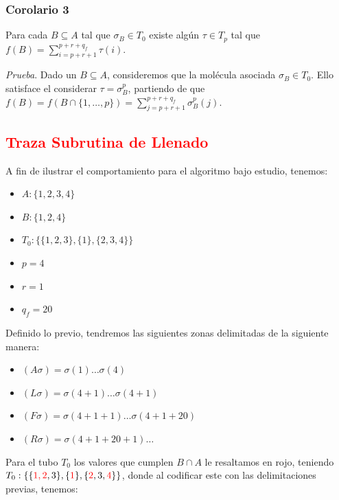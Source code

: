 \documentclass[12pt, letterpaper, twoside]{article}
\begin{document}
    \subsubsection{Corolario 3}
    Para cada $B\subseteq{A}$ tal que $\sigma_{B}\in{T_0}$ existe algún $\tau\in{T_{p}}$ tal que $f(B)=\sum^{p+r+q_f}_{i=p+r+1}\tau(i)$.

    \emph{Prueba}. Dado un $B\subseteq{A}$, consideremos que la molécula asociada $\sigma_{B}\in{T_0}$. Ello satisface el considerar $\tau=\sigma^{p}_{B}$, partiendo de que $f(B)=f(B\cap{\{1,\dots,p\}})=\sum^{p+r+q_f}_{j=p+r+1}\sigma^{p}_{B}(j)$. 

    \newpage
    \subsection{\textcolor{red}{Traza Subrutina de Llenado}}
    A fin de ilustrar el comportamiento para el algoritmo bajo estudio, tenemos:
    \begin{multicols}{2}
        \begin{itemize}
        \item $A: \{1, 2, 3, 4\}$
        \item $B: \{1, 2, 4\}$
        \item $T_0: \{\{1,2,3\}, \{1\}, \{2,3,4\}\}$
        \item $p = 4$
        \item $r = 1$
        \item $q_f= 20$
        \end{itemize}
    \end{multicols}

    Definido lo previo, tendremos las siguientes zonas delimitadas de la siguiente manera:
    \begin{multicols}{2}
        \begin{itemize}
            \item $(A\sigma )=\sigma (1)\dots\sigma (4)$
            \item $(L\sigma )=\sigma (4+1)\dots\sigma (4+1)$
            \item $(F\sigma)=\sigma(4+1+1)\dots\sigma(4+1+20)$
            \item $(R\sigma)=\sigma(4+1+20+1)\dots$
        \end{itemize} 
    \end{multicols}

    Para el tubo $T_0$ los valores que cumplen $B\cap{A}$ le resaltamos en rojo, teniendo $T_0: \{\{\textcolor{red}{1, 2}, 3\}, \{\textcolor{red}{1}\}, \{\textcolor{red}{2},3,\textcolor{red}{4}\}\}$, donde al codificar este con las delimitaciones previas, tenemos:
\end{document}
